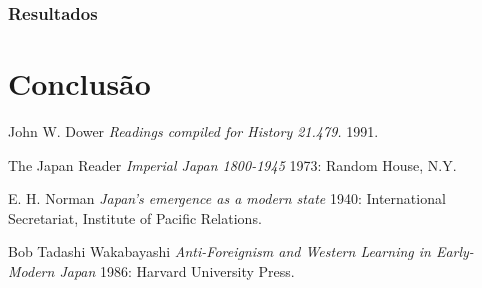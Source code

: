 \documentclass[
10pt, %
a4paper, %
oneside, %
headinclude,footinclude, %
BCOR5mm, %
]{scrartcl}
\theoremstyle{definition} %
\theoremstyle{plain} %
\theoremstyle{remark} %
\begin{document}
\subsubsection{Resultados}

\newpage

\section{Conclusão}

\newpage


\renewcommand{\refname}{\spacedlowsmallcaps{References}} %

\begin{thebibliography}{1}

   John W. Dower {\em Readings compiled for History
  21.479.}  1991.

    The Japan Reader {\em Imperial Japan 1800-1945} 1973:
  Random House, N.Y.

   E. H. Norman {\em Japan's emergence as a modern
  state} 1940: International Secretariat, Institute of Pacific
  Relations.

   Bob Tadashi Wakabayashi {\em Anti-Foreignism and Western
  Learning in Early-Modern Japan} 1986: Harvard University Press.

\end{thebibliography}



\end{document}
